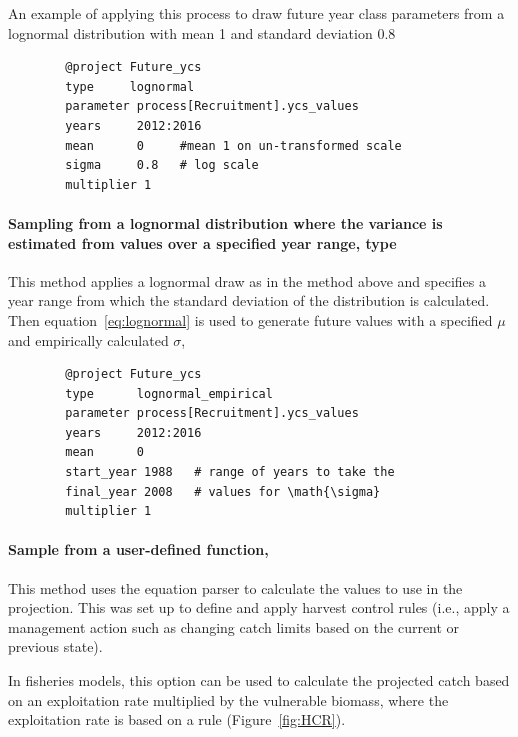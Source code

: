 An example of applying this process to draw future year class parameters from a lognormal distribution with mean 1 and standard deviation 0.8

{\small{\begin{verbatim}
		@project Future_ycs
		type     lognormal
		parameter process[Recruitment].ycs_values
		years     2012:2016
		mean      0     #mean 1 on un-transformed scale
		sigma     0.8   # log scale
		multiplier 1
		\end{verbatim}}}

\paragraph[Lognormal-Empirical]{Sampling from a lognormal distribution where the  variance is estimated from values over a specified year range, type   }\label{sec:Project-LogNormalEmpirical} 

This method applies a lognormal draw as in the  method above and specifies a year range from which the standard deviation of the distribution is calculated. Then equation~\eqref{eq:lognormal} is used to generate future values with a specified $\mu$ and empirically calculated $\sigma$,

{\small{\begin{verbatim}
		@project Future_ycs
		type      lognormal_empirical
		parameter process[Recruitment].ycs_values
		years     2012:2016
		mean      0
		start_year 1988   # range of years to take the
		final_year 2008   # values for \math{\sigma}
		multiplier 1
		\end{verbatim}}}

\paragraph[User Defined]{Sample from a user-defined function, }\label{sec:Project-UserDefined} 

This method uses the equation parser to calculate the values to use in the projection. This was set up to define and apply harvest control rules (i.e., apply a management action such as changing catch limits based on the current or previous state).

In fisheries models, this option can be used to calculate the projected catch based on an exploitation rate multiplied by the vulnerable biomass, where the exploitation rate is based on a rule (Figure~\ref{fig:HCR}).

